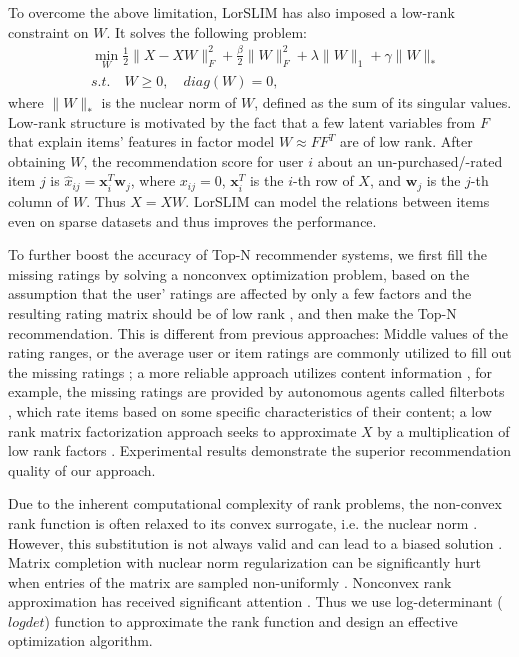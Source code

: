 \documentclass[letterpaper]{article}
\renewcommand{\vec}[1]{\mathbf{#1}}
\begin{document}
To overcome the above limitation, LorSLIM \cite{cheng2014lorslim} has also imposed a low-rank constraint on $W$. It solves the following problem:
\begin{equation*}
\begin{split}
&\min_W \frac{1}{2}\|X-XW\|_F^2+\frac{\beta}{2}\|W\|_F^2+\lambda \|W\|_1+\gamma\|W\|_*    \\
&s.t.\quad W\ge 0, \quad diag(W)=0,
\end{split}
\label{lorslim}
\end{equation*}
where $\|W\|_*$ is the nuclear norm of $W$, defined as the sum of its singular values. Low-rank structure is motivated by the fact that a few latent variables from $F$ that explain items' features in factor model $W\approx FF^T$ are of low rank. After obtaining $W$, the recommendation score for user $i$ about an un-purchased/-rated item $j$ is $\hat{x}_{ij}=\vec{x}_i^T\vec{w}_j$, where $x_{ij}=0$, $\vec{x}_i^T$ is the $i$-th row of $X$, and $\vec{w}_j$ is the $j$-th column of $W$. Thus $\hat{X}=XW$. %
LorSLIM can model the relations between items even on sparse datasets and thus improves the performance.

To further boost the accuracy of Top-N recommender systems, we first fill the missing ratings by solving a nonconvex optimization problem, based on the assumption that the user' ratings are affected by only a few factors and the resulting rating matrix should be of low rank \cite{lee2014local}, and then make the Top-N recommendation. This is different from previous approaches: Middle values of the rating ranges, or the average user or item ratings are commonly utilized to fill out the missing ratings \cite{breese1998empirical,deshpande2004item}; a more reliable approach utilizes content information \cite{melville2002content,li2004combining,degemmis2007content}, for example, the missing ratings are provided by autonomous agents called filterbots \cite{good1999combining}, which rate items based on some specific characteristics of their content; a low rank matrix factorization approach seeks to approximate $X$ by a multiplication of low rank factors \cite{yu2009fast}. Experimental results demonstrate the superior recommendation quality of our approach.

Due to the inherent computational complexity of rank problems, the non-convex rank function is often relaxed to its convex surrogate, i.e. the nuclear norm \cite{candes2009exact,recht2008necessary}. However, this substitution is not always valid and can lead to a biased solution \cite{shi2011limitations,kangcikm2015robust}. Matrix completion with nuclear norm regularization can be significantly hurt when entries of the matrix are sampled non-uniformly \cite{srebro2010collaborative}. Nonconvex rank approximation has received significant attention \cite{zhong2015nonconvex,kangICDM}. Thus we use log-determinant ($logdet$) function to approximate the rank function and design an effective optimization algorithm.
\end{document}
